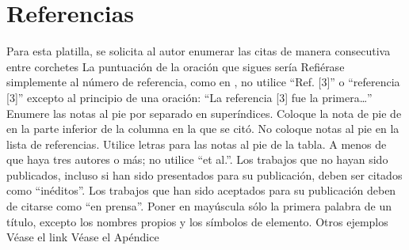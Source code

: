     \section*{Referencias}
    
    Para esta platilla, se solicita al autor enumerar las citas de manera consecutiva entre corchetes 
    La puntuación de la oración que sigues sería  
    Refiérase simplemente al número de referencia, como en , no utilice “Ref. [3]” o “referencia [3]” excepto al principio de una oración: “La referencia [3] fue la primera…”
    Enumere las notas al pie por separado en superíndices. Coloque la nota de pie de en la parte inferior de la columna en la que se citó. No coloque notas al pie en la lista de referencias. Utilice letras para las notas al pie de la tabla.
    A menos de que haya tres autores o más; no utilice “et al.”. Los trabajos que no hayan sido publicados, incluso si han sido presentados para su publicación, deben ser citados como “inéditos”. Los trabajos que han sido aceptados para su publicación deben de citarse como “en prensa”. Poner en mayúscula sólo la primera palabra de un título, excepto los nombres propios y los símbolos de elemento. 
    Otros ejemplos 
    Véase el link  Véase el Apéndice 
    
    
    
    
    
